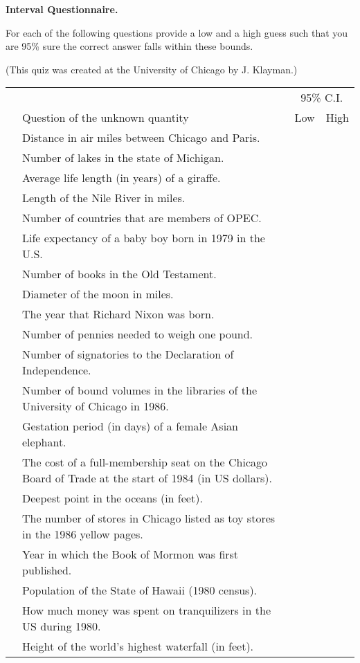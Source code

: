 \documentclass[12pt]{article}
\newcounter{deanscounter}
\newcommand{\I}{\arabic{deanscounter}\stepcounter{deanscounter}}
\begin{document}
\setcounter{deanscounter}{1}


{\bf Interval Questionnaire.}

\vspace{2ex}

For each of the following questions
  provide a low and a high guess such that you are 95\% sure the
  correct answer falls within these bounds. 

(This quiz was created at the University of Chicago by J. Klayman.)

\vspace{2ex}

\noindent
\begin{tabular}{|rp{4.5in}|c|c|}
\hline
&                                  &\multicolumn{2}{c|}{95\% C.I.} \\
& Question of the unknown quantity & Low & High \\ \hline
\I & Distance in air miles between Chicago and Paris. & & \\ \hline
\I & Number of lakes in the state of Michigan. & & \\ \hline
\I & Average life length (in years) of a giraffe. & & \\ \hline
\I & Length of the Nile River in miles. & & \\ \hline
\I & Number of countries that are members of OPEC. & & \\ \hline
\I & Life expectancy of a baby boy born in 1979 in the U.S. & & \\ \hline
\I & Number of books in the Old Testament. & & \\ \hline
\I & Diameter of the moon in miles. & & \\ \hline
\I & The year that Richard Nixon was born. & & \\ \hline
\I & Number of pennies needed to weigh one pound. & & \\ \hline
\I & Number of signatories to the Declaration of Independence. & & \\ \hline
\I & Number of bound volumes in the libraries of the University of
Chicago in 1986. & & \\ \hline
\I & Gestation period (in days) of a female Asian elephant. & & \\ \hline
\I & The cost of a full-membership seat on the Chicago Board of Trade
at the start of 1984 (in US dollars). & & \\ \hline
\I & Deepest point in the oceans (in feet). & & \\ \hline
\I &The number of stores in Chicago listed as toy stores in the 1986
yellow pages.  & & \\ \hline
\I & Year in which the Book of Mormon was first published. & & \\ \hline
\I & Population of the State of Hawaii (1980 census). & & \\ \hline
\I & How much money was spent on tranquilizers in the US during
1980. & & \\ \hline
\I & Height of the world's highest waterfall (in feet).  & & \\ \hline
\end{tabular}
\end{document}
